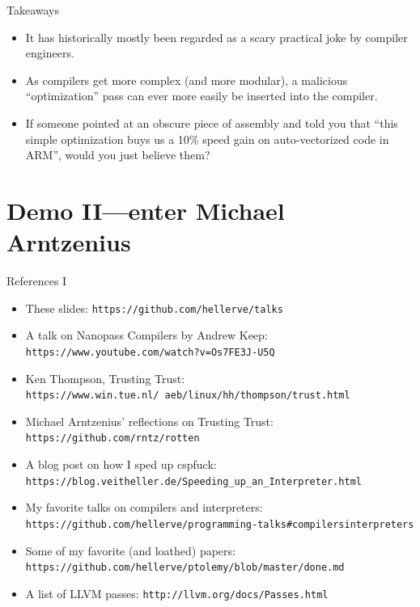 \documentclass[aspectratio=169]{beamer}
\begin{document}
  \begin{frame}{Takeaways}
    \begin{itemize}
      \item It has historically mostly been regarded as a scary practical joke
            by compiler engineers.
      \item As compilers get more complex (and more modular), a malicious
            “optimization” pass can ever more easily be inserted into the
            compiler.
      \item If someone pointed at an obscure piece of assembly and told you
            that “this simple optimization buys us a 10\% speed gain on
            auto-vectorized code in ARM”, would you just believe them?
    \end{itemize}
  \end{frame}
  \section{Demo II—enter Michael Arntzenius}
  \begin{frame}{References I}
    \begin{itemize}
      \item These slides: \texttt{https://github.com/hellerve/talks}
      \item A talk on Nanopass Compilers by Andrew Keep: \texttt{https://www.youtube.com/watch?v=Os7FE3J-U5Q}
      \item Ken Thompson, Trusting Trust: \texttt{https://www.win.tue.nl/~aeb/linux/hh/thompson/trust.html}
      \item Michael Arntzenius’ reflections on Trusting Trust: \texttt{https://github.com/rntz/rotten}
      \item A blog post on how I sped up cspfuck: \texttt{https://blog.veitheller.de/Speeding\_up\_an\_Interpreter.html}
      \item My favorite talks on compilers and interpreters: \texttt{https://github.com/hellerve/programming-talks\#compilersinterpreters}
      \item Some of my favorite (and loathed) papers: \texttt{https://github.com/hellerve/ptolemy/blob/master/done.md}
      \item A list of LLVM passes: \texttt{http://llvm.org/docs/Passes.html}
    \end{itemize}
  \end{frame}
\end{document}
